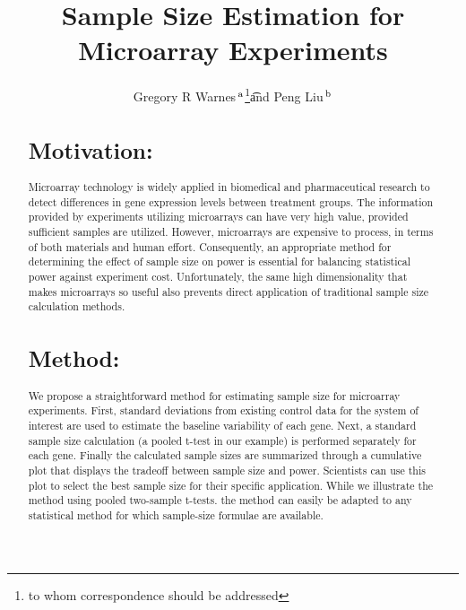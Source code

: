 \documentclass{bioinfo}
\begin{document}

\title{Sample Size Estimation for Microarray Experiments}
\author{
  Gregory R Warnes\,$^{\rm a}$\footnote{to whom correspondence should
    be addressed}\t
  and
  Peng Liu\,$^{\rm b}$
}
\address{
  $^{\rm a}$Nonclinical Statistics, Pfizer Global Research and Development,
  Groton, CT 06340 \\
  $^{\rm b}$Department of Biological Statistics and Computational
  Biology, Cornell University, Ithaca, NY 14853
  }

\maketitle

\begin{abstract}

\section{Motivation:}

Microarray technology is widely applied in biomedical and
pharmaceutical research to detect differences in gene expression
levels between treatment groups.  The information provided by
experiments utilizing microarrays can have very high value, provided
sufficient samples are utilized.  However, microarrays are expensive
to process, in terms of both materials and human effort.
Consequently, an appropriate method for determining the effect of
sample size on power is essential for balancing statistical power
against experiment cost. Unfortunately, the same high
dimensionality that makes microarrays so useful also prevents direct
application of traditional sample size calculation methods.

\section{Method:}

We propose a straightforward method for estimating sample size for
microarray experiments. First, standard deviations from existing
control data for the system of interest are used to estimate the
baseline variability of each gene. Next, a standard sample size
calculation (a pooled t-test in our example) is performed separately
for each gene.  Finally the calculated sample sizes are summarized
through a cumulative plot that displays the tradeoff between sample
size and power. Scientists can use this plot to select the best
sample size for their specific application.  While we illustrate the
method using pooled two-sample t-tests. the method can easily be
adapted to any statistical method for which sample-size formulae are
available.


\end{abstract}
\end{document}
